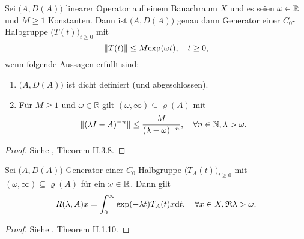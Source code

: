 \begin{satz}\label{Hille-Yosida}
Sei $\big(A, D(A)\big)$ linearer Operator auf einem Banachraum $X$ und es seien $\omega\in\mathbb{R}$ und $M\geq1$ Konstanten. Dann ist $\big(A, D(A)\big)$ genau dann Generator einer $C_0$-Halbgruppe $\big(T(t))_{t\geq0}$ mit 
\begin{equation*}
    \|T(t)\|\leq M\textnormal{exp}(\omega t),\quad t\geq0,
\end{equation*}
 wenn folgende Aussagen erfüllt sind:
\begin{enumerate}
\item $\big(A, D(A)\big)$ ist dicht definiert (und abgeschlossen).
\item Für $M\geq 1$ und  $\omega \in\mathbb R$ gilt $(\omega, \infty)\subseteq \varrho(A)$ mit
\begin{equation*}
\|(\lambda I- A)^{-n}\|\leq\frac{M}{ (\lambda - \omega)^{-n}},\quad\forall n\in\mathbb{N}, \lambda > \omega.
\end{equation*}
\end{enumerate}
\end{satz}

\begin{proof}
Siehe \cite{engel_nagel_2006}, Theorem II.3.8.
\end{proof}
\begin{prop}\label{Integraldarstellung der Resolvente}
Sei $\big(A, D(A)\big)$ Generator einer $C_0$-Halbgruppe $\big(T_A(t)\big)_{t\geq0}$  mit $(\omega,\infty)\subseteq\varrho(A)$ für ein $\omega\in\mathbb{R}$. Dann gilt
\begin{equation*}
R(\lambda, A)x = \int_0^\infty \exp(-\lambda t)T_A(t)x\textnormal dt,\quad  \forall x\in X, \mathfrak R \lambda >\omega.
\end{equation*}
\end{prop}

\begin{proof}
Siehe  \cite{engel_nagel_2006}, Theorem II.1.10.
\end{proof}





